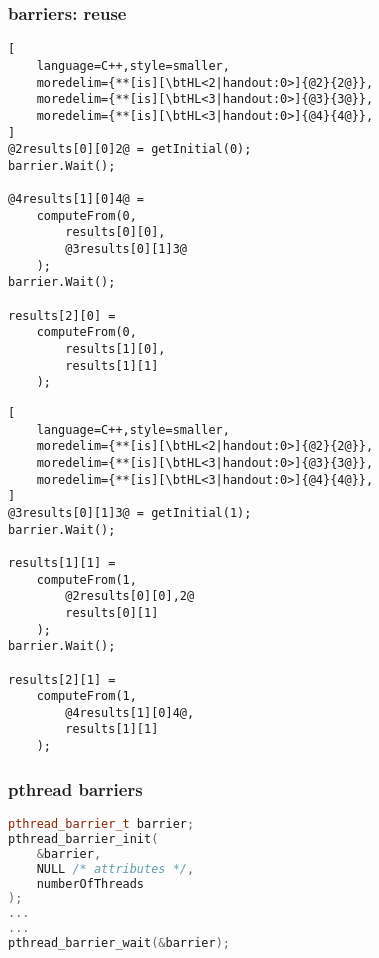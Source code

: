 \begin{frame}[fragile,label=barrierReuse]\frametitle{barriers: reuse}
\begin{minipage}{0.5\textwidth}
\begin{lstlisting}[
    language=C++,style=smaller,
    moredelim={**[is][\btHL<2|handout:0>]{@2}{2@}},
    moredelim={**[is][\btHL<3|handout:0>]{@3}{3@}},
    moredelim={**[is][\btHL<3|handout:0>]{@4}{4@}},
]
@2results[0][0]2@ = getInitial(0);
barrier.Wait();

@4results[1][0]4@ =
    computeFrom(0, 
        results[0][0],
        @3results[0][1]3@
    );
barrier.Wait();

results[2][0] =
    computeFrom(0,
        results[1][0],
        results[1][1]
    );
\end{lstlisting}
\end{minipage}
\begin{minipage}{0.45\textwidth}
\begin{lstlisting}[
    language=C++,style=smaller,
    moredelim={**[is][\btHL<2|handout:0>]{@2}{2@}},
    moredelim={**[is][\btHL<3|handout:0>]{@3}{3@}},
    moredelim={**[is][\btHL<3|handout:0>]{@4}{4@}},
]
@3results[0][1]3@ = getInitial(1);
barrier.Wait();

results[1][1] =
    computeFrom(1, 
        @2results[0][0],2@
        results[0][1]
    );
barrier.Wait();

results[2][1] =
    computeFrom(1,
        @4results[1][0]4@,
        results[1][1]
    );
\end{lstlisting}
\end{minipage}
\end{frame}

\begin{frame}[fragile,label=pthreadBarrier]\frametitle{pthread barriers}
\begin{lstlisting}[language=C++,style=smaller]
pthread_barrier_t barrier;
pthread_barrier_init(
    &barrier,
    NULL /* attributes */,
    numberOfThreads
);
...
...
pthread_barrier_wait(&barrier);
\end{lstlisting}
\end{frame}

